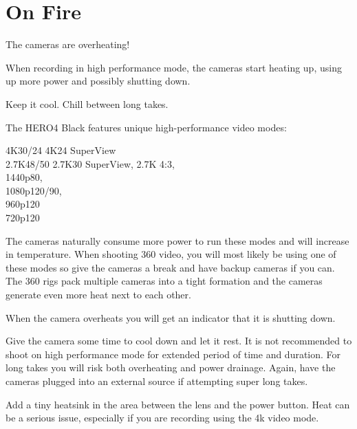 \chapter{On Fire}
\pagecolor{white}
\label{chap:19}
\begin{fullwidth}


\problem

{\large The cameras are overheating!


 \par}

When recording in high performance mode, the cameras start heating up, using up more power and possibly shutting down. 


\solution

{\large Keep it cool. Chill between long takes. 


 \par}

The HERO4 Black features unique high-performance video modes: 

4K30/24 4K24 SuperView
\\
2.7K48/50 2.7K30 SuperView, 2.7K 4:3, 
\\
1440p80, 
\\
1080p120/90, 
\\
960p120 
\\
720p120

The cameras naturally consume more power to run these modes and will increase in temperature. When shooting 360 video, you will most likely be using one of these modes so give the cameras a break and have backup cameras if you can. The 360 rigs pack multiple cameras into a tight formation and the cameras generate even more heat next to each other. 

\clearpage
When the camera overheats you will get an indicator that it is shutting down.

                 
Give the camera some time to cool down and let it rest. It is not recommended to shoot on high performance mode for extended period of time and duration. For long takes you will risk both overheating and power drainage. Again, have the cameras plugged into an external source if attempting super long takes. 

\tip Add a tiny heatsink in the area between the lens and the power button. Heat can be a serious issue, especially if you are recording using the 4k video mode.






\clearpage
\end{fullwidth}
